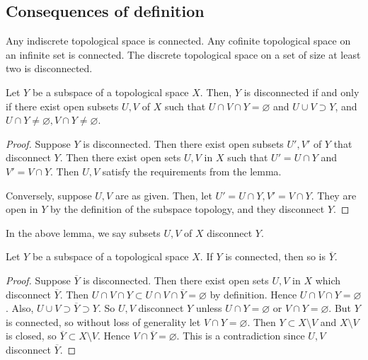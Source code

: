 \subsection{Consequences of definition}
\begin{example}
	Any indiscrete topological space is connected.
	Any cofinite topological space on an infinite set is connected.
	The discrete topological space on a set of size at least two is disconnected.
\end{example}
\begin{lemma}
	Let \( Y \) be a subspace of a topological space \( X \).
	Then, \( Y \) is disconnected if and only if there exist open subsets \( U, V \) of \( X \) such that \( U \cap V \cap Y = \varnothing \) and \( U \cup V \supset Y \), and \( U \cap Y \neq \varnothing, V \cap Y \neq \varnothing \).
\end{lemma}
\begin{proof}
	Suppose \( Y \) is disconnected.
	Then there exist open subsets \( U', V' \) of \( Y \) that disconnect \( Y \).
	Then there exist open sets \( U, V \) in \( X \) such that \( U' = U \cap Y \) and \( V' = V \cap Y \).
	Then \( U, V \) satisfy the requirements from the lemma.

	Conversely, suppose \( U, V \) are as given.
	Then, let \( U' = U \cap Y, V' = V \cap Y \).
	They are open in \( Y \) by the definition of the subspace topology, and they disconnect \( Y \).
\end{proof}
\begin{remark}
	In the above lemma, we say subsets \( U, V \) of \( X \) disconnect \( Y \).
\end{remark}
\begin{proposition}
	Let \( Y \) be a subspace of a topological space \( X \).
	If \( Y \) is connected, then so is \( \overline Y \).
\end{proposition}
\begin{proof}
	Suppose \( \overline Y \) is disconnected.
	Then there exist open sets \( U, V \) in \( X \) which disconnect \( \overline Y \).
	Then \( U \cap V \cap Y \subset U \cap V \cap \overline Y = \varnothing \) by definition.
	Hence \( U \cap V \cap Y = \varnothing \).
	Also, \( U \cup V \supset \overline Y \supset Y \).
	So \( U, V \) disconnect \( Y \) unless \( U \cap Y = \varnothing \) or \( V \cap Y = \varnothing \).
	But \( Y \) is connected, so without loss of generality let \( V \cap Y = \varnothing \).
	Then \( Y \subset X \setminus V \) and \( X \setminus V \) is closed, so \( \overline Y \subset X \setminus V \).
	Hence \( V \cap \overline Y = \varnothing \).
	This is a contradiction since \( U, V \) disconnect \( \overline Y \).
\end{proof}
